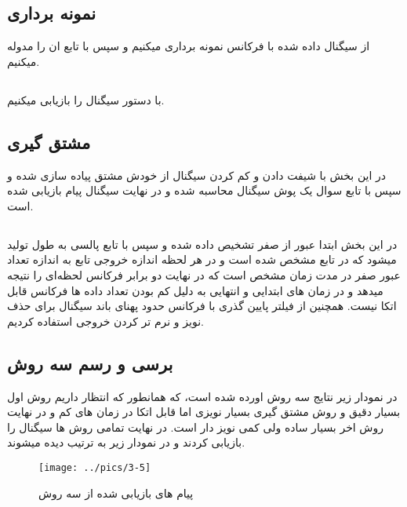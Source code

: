 \documentclass[10pt]{article}
\begin{document}
	\subsection{نمونه برداری}
	از سیگنال داده شده با فرکانس 
	نمونه برداری میکنیم و سپس با تابع 
	ان را مدوله میکنیم.
	\subsection{}
	با دستور 
	سیگنال را بازیابی میکنیم.
	
	\subsection{مشتق گیری}
	در این بخش با شیفت دادن و کم کردن سیگنال از خودش مشتق پیاده سازی شده و سپس با تابع سوال یک پوش سیگنال محاسبه شده و در نهایت سیگنال پیام بازیابی شده است.
	
	\subsection{}
	در این بخش ابتدا عبور از صفر تشخیص داده شده و سپس با تابع 
	پالسی به طول 
	تولید میشود که در تابع مشخص شده است و در هر لحظه اندازه خروجی تابع به اندازه تعداد عبور صفر در مدت زمان مشخص است که در نهایت دو برابر فرکانس لحظه‌ای را نتیجه میدهد و در زمان های ابتدایی و انتهایی به دلیل کم بودن تعداد داده ها فرکانس قابل اتکا نیست.
	همچنین از فیلتر پایین گذری با فرکانس حدود پهنای باند سیگنال برای حذف نویز و نرم تر کردن خروجی استفاده کردیم.
	
	\newpage
	\subsection{برسی و رسم سه روش}
	در نمودار زیر نتایج سه روش اورده شده است، که همانطور که انتظار داریم روش اول بسیار دقیق و روش مشتق گیری بسیار نویزی اما قابل اتکا در زمان های کم و در نهایت روش اخر بسیار ساده ولی کمی نویز دار است.
	در نهایت تمامی روش ها سیگنال را بازیابی کردند و در نمودار زیر به ترتیب دیده میشوند.
	
	
	\begin{figure}[h]
		\centering
		\texttt{[image: ../pics/3-5]}
		\caption{پیام های بازیابی شده از سه روش}
		\label{fig:3-5}
	\end{figure}
	
\end{document}
